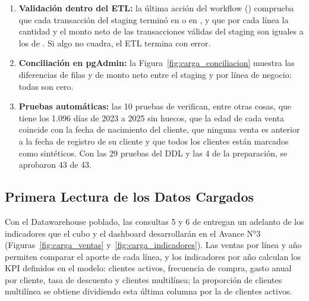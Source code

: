 \begin{enumerate}[leftmargin=*]
  \item \textbf{Validación dentro del ETL:} la última acción del workflow
        () comprueba que cada transacción del
        staging terminó en  o en , y que por
        cada línea la cantidad y el monto neto de las transacciones válidas
        del staging son iguales a los de . Si algo no cuadra,
        el ETL termina con error.
  \item \textbf{Conciliación en pgAdmin:} la Figura~\ref{fig:carga_conciliacion}
        muestra las diferencias de filas y de monto neto entre el staging y
         por línea de negocio: todas son cero.
  \item \textbf{Pruebas automáticas:} las 10 pruebas de
         verifican, entre otras cosas, que
         tiene los 1.096 días de 2023 a 2025 sin huecos, que la
        edad de cada venta coincide con la fecha de nacimiento del cliente, que
        ninguna venta es anterior a la fecha de registro de su cliente y que
        todos los clientes están marcados como sintéticos. Con las 29 pruebas
        del DDL y las 4 de la preparación, se aprobaron 43 de 43.
\end{enumerate}


\subsection{Primera Lectura de los Datos Cargados}

Con el Datawarehouse poblado, las consultas 5 y 6 de
 entregan un adelanto de los indicadores que el
cubo y el dashboard desarrollarán en el Avance N°3
(Figuras~\ref{fig:carga_ventas} y~\ref{fig:carga_indicadores}). Las ventas por
línea y año permiten comparar el aporte de cada línea, y los indicadores por
año calculan los KPI definidos en el modelo: clientes activos, frecuencia de
compra, gasto anual por cliente, tasa de descuento y clientes multilínea; la
proporción de clientes multilínea se obtiene dividiendo esta última columna
por la de clientes activos.

